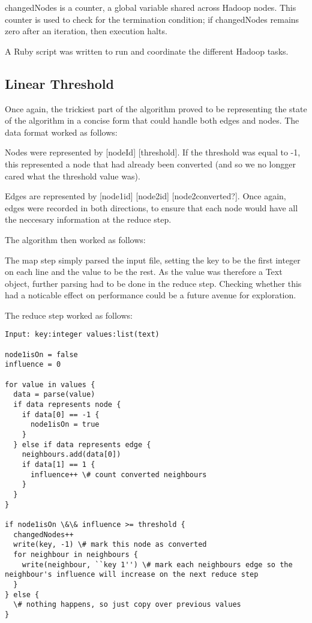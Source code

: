 changedNodes is a counter, a global variable shared across Hadoop nodes. This counter is used to check for the termination condition; if changedNodes remains zero after an iteration, then execution halts.

A Ruby script was written to run and coordinate the different Hadoop tasks.

\subsection{Linear Threshold}

Once again, the trickiest part of the algorithm proved to be representing the state of the algorithm in a concise form that could handle both edges and nodes. The data format worked as follows:

Nodes were represented by [nodeId] [threshold]. If the threshold was equal to -1, this represented a node that had already been converted (and so we no longger cared what the threshold value was).

Edges are represented by [node1id] [node2id] [node2converted?]. Once again, edges were recorded in both directions, to ensure that each node would have all the neccesary information at the reduce step.

The algorithm then worked as follows:

The map step simply parsed the input file, setting the key to be the first integer on each line and the value to be the rest. As the value was therefore a Text object, further parsing had to be done in the reduce step. Checking whether this had a noticable effect on performance could be a future avenue for exploration.

The reduce step worked as follows:

\begin{verbatim}
Input: key:integer values:list(text)

node1isOn = false
influence = 0

for value in values {
  data = parse(value)
  if data represents node {
    if data[0] == -1 {
      node1isOn = true
    }
  } else if data represents edge {
    neighbours.add(data[0])
    if data[1] == 1 {
      influence++ \# count converted neighbours
    }
  }
}

if node1isOn \&\& influence >= threshold {
  changedNodes++
  write(key, -1) \# mark this node as converted
  for neighbour in neighbours {
    write(neighbour, ``key 1'') \# mark each neighbours edge so the neighbour's influence will increase on the next reduce step
  }
} else {
  \# nothing happens, so just copy over previous values
}
\end{verbatim}

